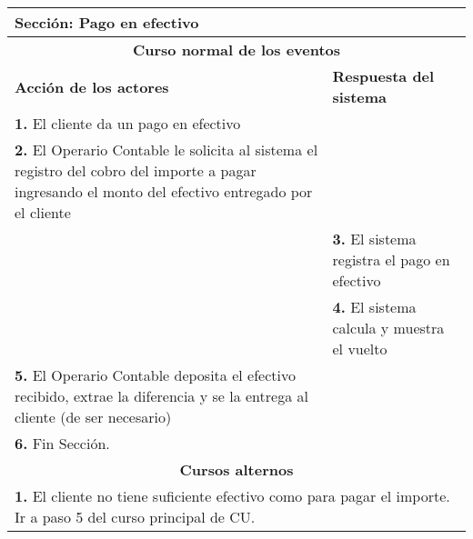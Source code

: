 \documentclass[12pt]{extarticle}
\begin{document}
    \begin{longtable}{ |p{8cm}|p{8cm}| }
        \hline
        
        \multicolumn{2}{|p{16cm}|}{\textbf{Sección}: Pago en efectivo}\\
        \hline
        \multicolumn{2}{|c|}{\textbf{Curso normal de los eventos}}\\
        \hline
        \textbf{Acción de los actores} & \textbf{Respuesta del sistema}\\
        \hline
            \textbf{1. } El cliente da un pago en efectivo& \\
            \hline
            \textbf{2. } El Operario Contable le solicita al sistema el registro del cobro del importe a pagar ingresando el monto del efectivo entregado por el cliente& \\
            \hline
            & \textbf{3. } El sistema registra el pago en efectivo\\
            \hline
            & \textbf{4. } El sistema calcula y muestra el vuelto\\
            \hline
            \textbf{5. } El Operario Contable deposita el efectivo recibido, extrae la diferencia y se la entrega al cliente (de ser necesario)&\\
            \hline
            \textbf{6. }Fin Sección. & \\
        \hline
        \multicolumn{2}{|c|}{\textbf{Cursos alternos}}\\
        \hline
        \multicolumn{2}{|p{16cm}|}{\textbf{1. } El cliente no tiene suficiente efectivo como para pagar el importe. Ir a paso 5 del curso principal de CU.}\\
        \hline
    \end{longtable}
    
\end{document}
